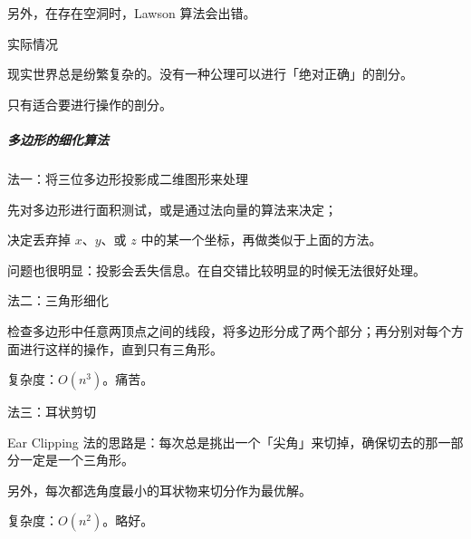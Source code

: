 \documentclass[
]{article}
\begin{document}
另外，在存在空洞时，Lawson 算法会出错。

实际情况

现实世界总是纷繁复杂的。没有一种公理可以进行「绝对正确」的剖分。

只有适合要进行操作的剖分。

\hypertarget{header-n83}{%
\subparagraph{多边形的细化算法}\label{header-n83}}

法一：将三位多边形投影成二维图形来处理

先对多边形进行面积测试，或是通过法向量的算法来决定；

决定丢弃掉 \(x\)、\(y\)、或 \(z\) 中的某一个坐标，再做类似于上面的方法。

问题也很明显：投影会丢失信息。在自交错比较明显的时候无法很好处理。

法二：三角形细化

检查多边形中任意两顶点之间的线段，将多边形分成了两个部分；再分别对每个方面进行这样的操作，直到只有三角形。

复杂度：\(O(n^3)\)。痛苦。

法三：耳状剪切

Ear Clipping
法的思路是：每次总是挑出一个「尖角」来切掉，确保切去的那一部分一定是一个三角形。

另外，每次都选角度最小的耳状物来切分作为最优解。

复杂度：\(O(n^2)\)。略好。
\end{document}
